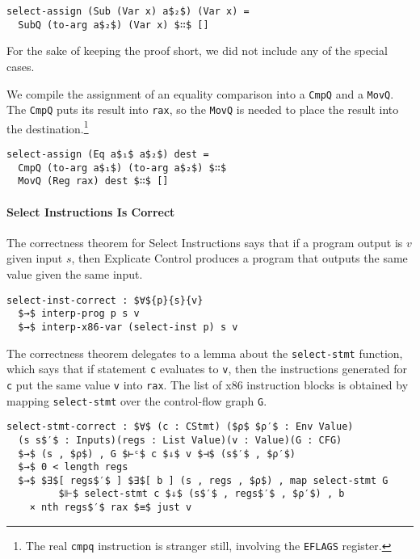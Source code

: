 \documentclass[sigplan,screen]{acmart}
\begin{document}
\begin{lstlisting}
select-assign (Sub (Var x) a$₂$) (Var x) = 
  SubQ (to-arg a$₂$) (Var x) $∷$ []
\end{lstlisting}

\noindent For the sake of keeping the proof short, we did not include
any of the special cases.

We compile the assignment of an equality comparison into a
\lstinline{CmpQ} and a \lstinline{MovQ}. The \lstinline{CmpQ} puts its
result into \lstinline{rax}, so the \lstinline{MovQ} is needed to
place the result into the destination.\footnote{The real
\lstinline{cmpq} instruction is stranger still, involving the
\lstinline{EFLAGS} register.}

\begin{lstlisting}
select-assign (Eq a$₁$ a$₂$) dest =
  CmpQ (to-arg a$₁$) (to-arg a$₂$) $∷$
  MovQ (Reg rax) dest $∷$ []
\end{lstlisting}


\paragraph{Select Instructions Is Correct}

The correctness theorem for Select Instructions says that if a program
output is $v$ given input $s$, then Explicate Control produces a
program that outputs the same value given the same input.

\begin{lstlisting}
select-inst-correct : $∀${p}{s}{v}
  $→$ interp-prog p s v
  $→$ interp-x86-var (select-inst p) s v
\end{lstlisting}

The correctness theorem delegates to a lemma about the
\lstinline{select-stmt} function, which says that if statement
\lstinline{c} evaluates to \lstinline{v}, then the instructions
generated for \lstinline{c} put the same value \lstinline{v} into
\lstinline{rax}.  The list of x86 instruction blocks is obtained by
mapping \lstinline{select-stmt} over the control-flow graph
\lstinline{G}.

\begin{lstlisting}[basicstyle=\ttfamily\footnotesize]
select-stmt-correct : $∀$ (c : CStmt) ($ρ$ $ρ′$ : Env Value)
  (s s$′$ : Inputs)(regs : List Value)(v : Value)(G : CFG)
  $→$ (s , $ρ$) , G $⊢ᶜ$ c $⇓$ v $⊣$ (s$′$ , $ρ′$)
  $→$ 0 < length regs
  $→$ $∃$[ regs$′$ ] $∃$[ b ] (s , regs , $ρ$) , map select-stmt G
         $⊩$ select-stmt c $⇓$ (s$′$ , regs$′$ , $ρ′$) , b
    × nth regs$′$ rax $≡$ just v
\end{lstlisting}
\end{document}
